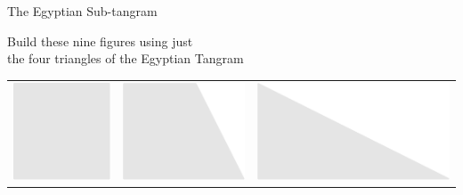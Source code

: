 \documentclass[14pt]{beamer}
\begin{document}
    \begin{frame}{The Egyptian Sub-tangram}
        \begin{center}
            Build these nine figures using just\\the four triangles of the Egyptian Tangram

            \bigskip\bigskip

            \begin{tabular}{ccc}
                    \includegraphics[scale=0.3]{figures/figure023a.pdf} \;\;&
                \;\;\includegraphics[scale=0.3]{figures/figure023b.pdf} \;\;&
                \;\;\includegraphics[scale=0.3]{figures/figure023c.pdf} \\[2ex]

\end{tabular}
\end{center}
\end{frame}
\end{document}

